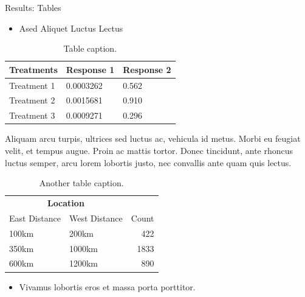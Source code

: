 \documentclass{beamer} %
\begin{document}
\begin{frame}[t]
\begin{columns}[t]
\begin{column}{0.3\textwidth}
			\begin{block}{Results: Tables}
				\begin{itemize}
					\item Ased Aliquet Luctus Lectus
				\end{itemize}

				\begin{table}
					\caption{Table caption.}
					\begin{tabular}{l l l}
						\toprule
						\textbf{Treatments} & \textbf{Response 1} & \textbf{Response 2} \\
						\midrule
						Treatment 1         & 0.0003262           & 0.562               \\
						Treatment 2         & 0.0015681           & 0.910               \\
						Treatment 3         & 0.0009271           & 0.296               \\
						\bottomrule
					\end{tabular}
				\end{table}

				\bigskip\bigskip %

				Aliquam arcu turpis, ultrices sed luctus ac, vehicula id metus. Morbi eu feugiat velit, et tempus augue. Proin ac mattis tortor. Donec tincidunt, ante rhoncus luctus semper, arcu lorem lobortis justo, nec convallis ante quam quis lectus.

				\begin{table} %
					\caption{Another table caption.}
					\begin{tabular}{l l r}
						\toprule
						\multicolumn{2}{c}{\textbf{Location}} \\
						\cmidrule(r){1-2}
						East Distance & West Distance & Count \\
						\midrule
						100km         & 200km         & 422   \\
						350km         & 1000km        & 1833  \\
						600km         & 1200km        & 890   \\
						\bottomrule
					\end{tabular}
				\end{table}

				\bigskip\bigskip %

				\begin{itemize}
					\item Vivamus lobortis eros et massa porta porttitor.
				\end{itemize}
			\end{block}


\end{column}
\end{columns}
\end{frame}
\end{document}
